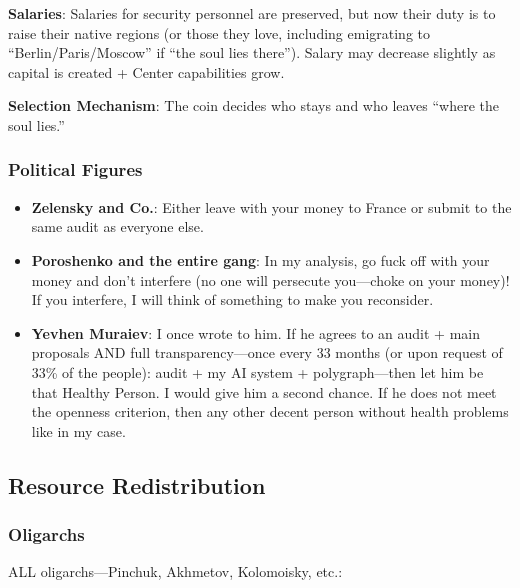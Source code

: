 \documentclass[11pt,a4paper]{article}
\theoremstyle{definition}
\theoremstyle{remark}
\begin{document}
\textbf{Salaries}: Salaries for security personnel are preserved, but now their duty is to raise their native regions (or those they love, including emigrating to ``Berlin/Paris/Moscow'' if ``the soul lies there''). Salary may decrease slightly as capital is created + Center capabilities grow.

\textbf{Selection Mechanism}: The coin decides who stays and who leaves ``where the soul lies.''

\subsubsection{Political Figures}

\begin{itemize}
\item \textbf{Zelensky and Co.}: Either leave with your money to France or submit to the same audit as everyone else.

\item \textbf{Poroshenko and the entire gang}: In my analysis, go fuck off with your money and don't interfere (no one will persecute you—choke on your money)! If you interfere, I will think of something to make you reconsider.

\item \textbf{Yevhen Muraiev}: I once wrote to him. If he agrees to an audit + main proposals AND full transparency—once every 33 months (or upon request of 33\% of the people): audit + my AI system + polygraph—then let him be that Healthy Person. I would give him a second chance. If he does not meet the openness criterion, then any other decent person without health problems like in my case.
\end{itemize}

\subsection{Resource Redistribution}

\subsubsection{Oligarchs}

ALL oligarchs—Pinchuk, Akhmetov, Kolomoisky, etc.:

\begin{center}
\end{center}
\end{document}
